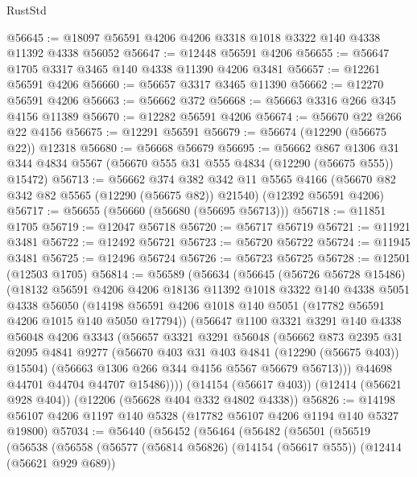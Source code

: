 \begin{lexlean}{RustStd}
\begin{coremodule}
{\begin{coremodule}
{{{{{{{{{{{{{{{{{{{{{{{{{{{{{{{{{{{{{{{{{{{{{{{{{{@56645 := @18097 @56591 @4206 @4206 @3318 @1018 @3322 @140 @4338 @11392 @4338 @56052
@56647 := @12448 @56591 @4206
@56655 := @56647 @1705 @3317 @3465 @140 @4338 @11390 @4206 @3481
@56657 := @12261 @56591 @4206
@56660 := @56657 @3317 @3465 @11390
@56662 := @12270 @56591 @4206
@56663 := @56662 @372
@56668 := @56663 @3316 @266 @345 @4156 @11389
@56670 := @12282 @56591 @4206
@56674 := @56670 @22 @266 @22 @4156
@56675 := @12291 @56591
@56679 := @56674 (@12290 (@56675 @22)) @12318
@56680 := @56668 @56679
@56695 := @56662
    @867
    @1306
    @31
    @344
    @4834
    @5567
    (@56670 @555 @31 @555 @4834 (@12290 (@56675 @555)) @15472)
@56713 := @56662
    @374
    @382
    @342
    @11
    @5565
    @4166
    (@56670 @82 @342 @82 @5565 (@12290 (@56675 @82)) @21540)
    (@12392 @56591 @4206)
@56717 := @56655 (@56660 (@56680 (@56695 @56713)))
@56718 := @11851 @1705
@56719 := @12047 @56718
@56720 := @56717 @56719
@56721 := @11921 @3481
@56722 := @12492 @56721
@56723 := @56720 @56722
@56724 := @11945 @3481
@56725 := @12496 @56724
@56726 := @56723 @56725
@56728 := @12501 (@12503 @1705)
@56814 := @56589
    (@56634
      (@56645
        (@56726 @56728 @15486)
        (@18132
          @56591
          @4206
          @4206
          @18136
          @11392
          @1018
          @3322
          @140
          @4338
          @5051
          @4338
          @56050
          (@14198 @56591 @4206 @1018 @140 @5051 (@17782 @56591 @4206 @1015 @140 @5050 @17794))
          (@56647
            @1100
            @3321
            @3291
            @140
            @4338
            @56048
            @4206
            @3343
            (@56657
              @3321
              @3291
              @56048
              (@56662
                @873
                @2395
                @31
                @2095
                @4841
                @9277
                (@56670 @403 @31 @403 @4841 (@12290 (@56675 @403)) @15504)
                (@56663 @1306 @266 @344 @4156 @5567 @56679 @56713)))
            @44698
            @44701
            @44704
            @44707
            @15486))))
    (@14154 (@56617 @403))
    (@12414 (@56621 @928 @404))
    (@12206 (@56628 @404 @332 @4802 @4338))
@56826 := @14198 @56107 @4206 @1197 @140 @5328 (@17782 @56107 @4206 @1194 @140 @5327 @19800)
@57034 := @56440
    (@56452
      (@56464
        (@56482
          (@56501
            (@56519
              (@56538
                (@56558
                  (@56577
                    (@56814 @56826)
                    (@14154 (@56617 @555))
                    (@12414 (@56621 @929 @689))
}}}}}}}}}}}}}}}}}}}}}}}}}}}}}}}}}}}}}}}}}}}}}}}}}}
\end{coremodule}}
\end{coremodule}
\end{lexlean}
